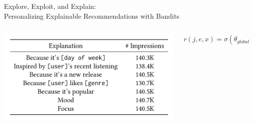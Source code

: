 \documentclass[11pt,aspectratio=169,handout]{beamer}
\begin{document}
\begin{frame}{Explore, Exploit, and Explain: \\ Personalizing Explainable Recommendations with Bandits \cite{EX3}}

\begin{columns}
\begin{column}{0.4\textwidth}
\begin{center}
\includegraphics[scale=0.4]{images/spotify.png}
\end{center}
\end{column}

\begin{column}{0.5\textwidth}
\[
r(j, e, x) = \sigma(\theta_{global} + \theta_{j} \times 1_j + \theta_e \times 1_e + \theta_x \times 1_x)
\]
\end{column}
\end{columns}

\end{frame}
\end{document}
